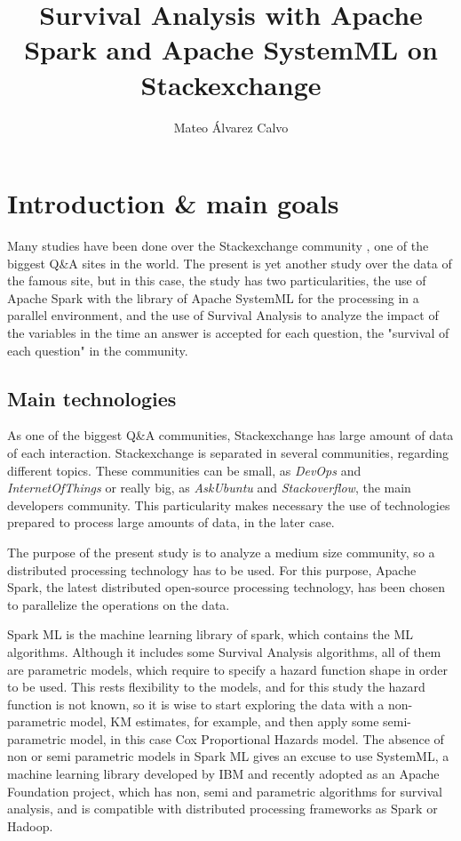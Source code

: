 \documentclass[11pt]{book} %
\title{Survival Analysis with Apache Spark and Apache SystemML on Stackexchange}
\author{Mateo Álvarez Calvo}
\begin{document}
\maketitle

\newpage
\tableofcontents
\listoffigures
\listoftables
\lstlistoflistings


\chapter{Introduction \& main goals}
  \label{sec:introduction}
  Many studies have been done over the Stackexchange community \cite{stackoverflow_paper}, one of the biggest Q\&A sites in the world. The present is yet another study over the data of the famous site, but in this case, the study has two particularities, the use of Apache Spark with the library of Apache SystemML for the processing in a parallel environment, and the use of Survival Analysis to analyze the impact of the variables in the time an answer is accepted for each question, the "survival of each question" in the community.


  \section{Main technologies}

    As one of the biggest Q\&A communities, Stackexchange has large amount of data of each interaction.
    Stackexchange is separated in several communities, regarding different topics. These communities can be small, as \emph{DevOps} and \emph{InternetOfThings} or really big, as \emph{AskUbuntu} and \emph{Stackoverflow}, the main developers community. This particularity makes necessary the use of technologies prepared to process large amounts of data, in the later case.

    The purpose of the present study is to analyze a medium size community, so a distributed processing technology has to be used. For this purpose, Apache Spark, the latest distributed open-source processing technology, has been chosen to parallelize the operations on the data.

    Spark ML is the machine learning library of spark, which contains the ML algorithms. Although it includes some Survival Analysis algorithms, all of them are parametric models, which require to specify a hazard function shape in order to be used. This rests flexibility to the models, and for this study the hazard function is not known, so it is wise to start exploring the data with a non-parametric model, KM estimates, for example, and then apply some semi-parametric model, in this case Cox Proportional Hazards model. The absence of non or semi parametric models in Spark ML gives an excuse to use SystemML, a machine learning library developed by IBM and recently adopted as an Apache Foundation project, which has non, semi and parametric algorithms for survival analysis, and is compatible with distributed processing frameworks as Spark or Hadoop.
\end{document}

